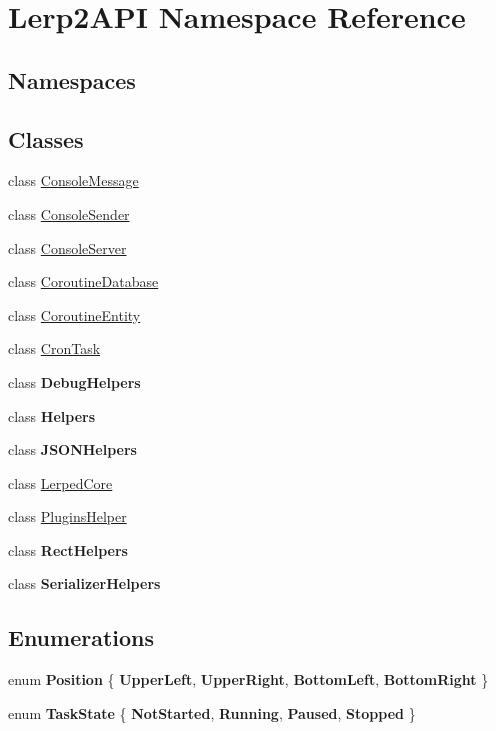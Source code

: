 \hypertarget{namespace_lerp2_a_p_i}{}\section{Lerp2\+A\+PI Namespace Reference}
\label{namespace_lerp2_a_p_i}
\subsection*{Namespaces}
\begin{DoxyCompactItemize}
\end{DoxyCompactItemize}
\subsection*{Classes}
\begin{DoxyCompactItemize}
\item 
class \hyperlink{class_lerp2_a_p_i_1_1_console_message}{Console\+Message}
\item 
class \hyperlink{class_lerp2_a_p_i_1_1_console_sender}{Console\+Sender}
\item 
class \hyperlink{class_lerp2_a_p_i_1_1_console_server}{Console\+Server}
\item 
class \hyperlink{class_lerp2_a_p_i_1_1_coroutine_database}{Coroutine\+Database}
\item 
class \hyperlink{class_lerp2_a_p_i_1_1_coroutine_entity}{Coroutine\+Entity}
\item 
class \hyperlink{class_lerp2_a_p_i_1_1_cron_task}{Cron\+Task}
\item 
class {\bfseries Debug\+Helpers}
\item 
class {\bfseries Helpers}
\item 
class {\bfseries J\+S\+O\+N\+Helpers}
\item 
class \hyperlink{class_lerp2_a_p_i_1_1_lerped_core}{Lerped\+Core}
\item 
class \hyperlink{class_lerp2_a_p_i_1_1_plugins_helper}{Plugins\+Helper}
\item 
class {\bfseries Rect\+Helpers}
\item 
class {\bfseries Serializer\+Helpers}
\end{DoxyCompactItemize}
\subsection*{Enumerations}
\begin{DoxyCompactItemize}
\item 
\mbox{\label{namespace_lerp2_a_p_i_a5b0f263f740f1f4c8b67cf0c011dd90d}} 
enum {\bfseries Position} \{ {\bfseries Upper\+Left}, 
{\bfseries Upper\+Right}, 
{\bfseries Bottom\+Left}, 
{\bfseries Bottom\+Right}
 \}
\item 
\mbox{\label{namespace_lerp2_a_p_i_a2bd1eb398ec1f41af93fa4ee7408681e}} 
enum {\bfseries Task\+State} \{ {\bfseries Not\+Started}, 
{\bfseries Running}, 
{\bfseries Paused}, 
{\bfseries Stopped}
 \}
\end{DoxyCompactItemize}
